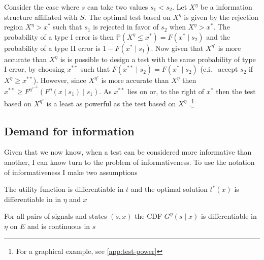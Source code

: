 \begin{example}\label{ex:t-transformation-2}
Consider the case where $s$ can take two values $s_{1}<s_{2}$. Let $X^{\eta}$ be a information structure affiliated with $S$. The optimal test based on $X^{\eta}$ is given by the rejection region $X^{\eta}>x^{*}$  such that $s_{1}$ is rejected in favor of $s_{2}$ when $X^{\eta}>x^{*}$. The probability of a type I error is then $\mathbb{P}(X^{\eta}\le x^{*})=F(x^{*}\mid s_{2})$ and the probability of a type II error is $1-F(x^{*}\mid s_{1})$. Now given that $X^{\eta'}$ is more accurate than $X^{\eta}$ is is possible to design a test with the same probability of type I error, by choosing $x^{**}$ such that $F(x^{**}\mid s_{2})=F(x^{*}\mid s_{2})$ (e.i. \ accept $s_{2}$ if $X^{\eta}\ge x^{**}$). However, since $X^{\eta'}$ is more accurate than $X^{\eta}$  then $x^{**}\ge F^{\eta'^{-1}}(F^{\eta}(x\mid s_{1})\mid s_{1})$. As $x^{**}$ lies on or, to the right of $x^{*}$ then the test based on $X^{\eta'}$ is a least as powerful as the test based on $X^{\eta}$ \citep{Lehmann1988Comparing,Persico2000Information}.\footnote{For a graphical example, see \cref{app:test-power}}
\end{example}


\subsection{Demand for information}

Given that we now know, when a test can be considered more informative than another, I can know turn to the problem of informativeness. To use the notation of informativeness I make two assumptions

\begin{assumption}
	The utility function is differentiable in $t$ and the optimal solution $t^*(x)$ is differentiable in in $\eta$ and $x$
\end{assumption}
\begin{assumption}
	For all pairs of signals and states $(s,x)$ the CDF $G^\eta(s\mid x)$ is differentiable in $\eta$ on $E$ and is continuous in $s$
\end{assumption}

